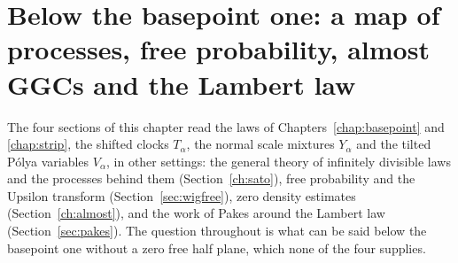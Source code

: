 \chapter{Below the basepoint one: a map of processes, free probability, almost GGCs and the Lambert law}\label{chap:almost}

The four sections of this chapter read the laws of Chapters~\ref{chap:basepoint} and \ref{chap:strip}, the shifted clocks $T_\alpha$, the normal scale mixtures $Y_\alpha$ and the tilted P\'olya variables $V_\alpha$, in other settings: the general theory of infinitely divisible laws and the processes behind them (Section~\ref{ch:sato}), free probability and the Upsilon transform (Section~\ref{sec:wigfree}), zero density estimates (Section~\ref{ch:almost}), and the work of Pakes around the Lambert law (Section~\ref{sec:pakes}). The question throughout is what can be said below the basepoint one without a zero free half plane, which none of the four supplies.
